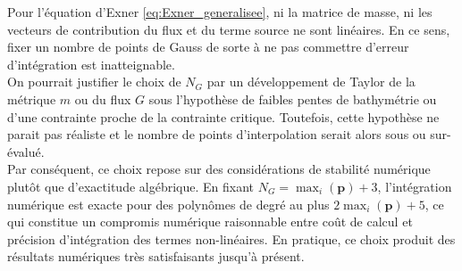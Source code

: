 \documentclass[11pt, a4paper, oneside]{report}
\begin{document}
Pour l'équation d'Exner \eqref{eq:Exner_generalisee}, ni la matrice de masse, ni les vecteurs de contribution du flux et du terme source ne sont linéaires. En ce sens, fixer un nombre de points de Gauss de sorte à ne pas commettre d'erreur d'intégration est inatteignable. \\
On pourrait justifier le choix de $N_G$ par un développement de Taylor de la métrique $m$ ou du flux $G$ sous l'hypothèse de faibles pentes de bathymétrie ou d'une contrainte proche de la contrainte critique. Toutefois, cette hypothèse ne parait pas réaliste et le nombre de points d'interpolation serait alors sous ou sur-évalué. \\
Par conséquent, ce choix repose sur des considérations de stabilité numérique plutôt que d'exactitude algébrique. En fixant $N_G = \max_i(\mathbf{p})+3$, l'intégration numérique est exacte pour des polynômes de degré au plus $2\max_i(\mathbf{p})+5$, ce qui constitue un compromis numérique raisonnable entre coût de calcul et précision d'intégration des termes non-linéaires. En pratique, ce choix produit des résultats numériques très satisfaisants jusqu'à présent. \\
\end{document}
